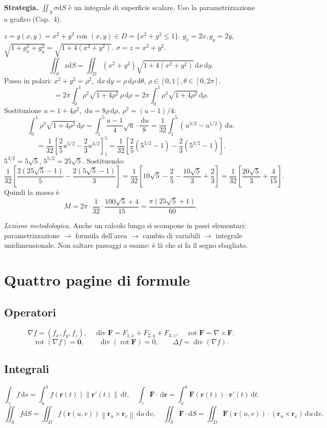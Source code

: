 \documentclass[11pt,a4paper,openany]{book}
\theoremstyle{plain}
\theoremstyle{definition}
\theoremstyle{remark}
\newcommand{\dd}{\,\mathrm{d}}
\newcommand{\Div}{\operatorname{div}}
\newcommand{\Rot}{\operatorname{rot}}
\renewcommand{\vec}[1]{\mathbf{#1}}
\newcommand{\F}{\mathbf{F}}
\newcommand{\rr}{\mathbf{r}}
\newcommand{\dS}{\mathrm{d}S}
\newcommand{\norm}[1]{\left\lVert #1 \right\rVert}
\begin{document}
\begin{esempio}
\textbf{Strategia.} $\iint_S\sigma\dS$ \`e un integrale di superficie scalare.
Uso la parametrizzazione a grafico (Cap.~4).

$z=g(x,y)=x^2+y^2$ con $(x,y)\in D=\{x^2+y^2\le 1\}$.
$g_x=2x,g_y=2y$, $\sqrt{1+g_x^2+g_y^2}=\sqrt{1+4(x^2+y^2)}$.
$\sigma=z=x^2+y^2$.
\[
  \iint_S z\dS=\iint_D(x^2+y^2)\sqrt{1+4(x^2+y^2)}\dd x\dd y.
\]
Passo in polari: $x^2+y^2=\rho^2$, $\dd x\dd y=\rho\dd\rho\dd\theta$,
$\rho\in[0,1],\theta\in[0,2\pi]$.
\[
  =2\pi\int_0^1\rho^2\sqrt{1+4\rho^2}\,\rho\dd\rho=2\pi\int_0^1\rho^3\sqrt{1+4\rho^2}\dd\rho.
\]
Sostituzione $u=1+4\rho^2$, $\dd u=8\rho\dd\rho$, $\rho^2=(u-1)/4$:
\[
  \int_0^1\rho^3\sqrt{1+4\rho^2}\dd\rho
  =\int_1^5\frac{u-1}{4}\sqrt{u}\cdot\frac{\dd u}{8}
  =\frac{1}{32}\int_1^5(u^{3/2}-u^{1/2})\dd u.
\]
\[
  =\frac{1}{32}\left[\frac{2}{5}u^{5/2}-\frac{2}{3}u^{3/2}\right]_1^5
  =\frac{1}{32}\left[\frac{2}{5}(5^{5/2}-1)-\frac{2}{3}(5^{3/2}-1)\right].
\]
$5^{3/2}=5\sqrt5$, $5^{5/2}=25\sqrt5$. Sostituendo:
\[
  \frac{1}{32}\left[\frac{2(25\sqrt5-1)}{5}-\frac{2(5\sqrt5-1)}{3}\right]
  =\frac{1}{32}\left[10\sqrt5-\frac{2}{5}-\frac{10\sqrt5}{3}+\frac{2}{3}\right]
  =\frac{1}{32}\left[\frac{20\sqrt5}{3}+\frac{4}{15}\right].
\]
Quindi la massa \`e
\[
  M=2\pi\cdot\frac{1}{32}\cdot\frac{100\sqrt5+4}{15}=\frac{\pi(25\sqrt5+1)}{60}.
\]

\textsl{Lezione metodologica.} Anche un calcolo lungo si scompone in passi
elementari: parametrizzazione $\to$ formula dell'area $\to$ cambio di
variabili $\to$ integrale unidimensionale. Non saltare passaggi a esame:
\`e l\`a che si fa il segno sbagliato.
\end{esempio}

\appendix
\chapter{Quattro pagine di formule}

\section*{Operatori}
\[
\nabla f=(f_x,f_y,f_z),\quad
\Div\F=F_{1,x}+F_{2,y}+F_{3,z},\quad
\Rot\F=\nabla\times\F.
\]
\[
\Rot(\nabla f)=\vec{0},\qquad \Div(\Rot\F)=0,\qquad \Delta f=\Div(\nabla f).
\]

\section*{Integrali}
\[
\int_\gamma f\dd s=\int_a^b f(\rr(t))\norm{\rr'(t)}\dd t,\quad
\int_\gamma\F\cdot\dd\rr=\int_a^b\F(\rr(t))\cdot\rr'(t)\dd t.
\]
\[
\iint_S f\dS=\iint_D f(\rr(u,v))\norm{\rr_u\times\rr_v}\dd u\dd v,\quad
\iint_S\F\cdot\dS=\iint_D\F(\rr(u,v))\cdot(\rr_u\times\rr_v)\dd u\dd v.
\]
\end{document}

